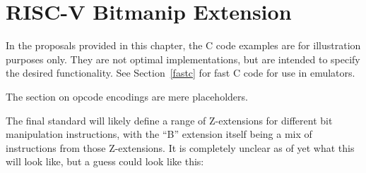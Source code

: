 \chapter{RISC-V Bitmanip Extension}
\label{bext}

In the proposals provided in this chapter, the C code examples are for
illustration purposes only. They are not optimal implementations, but are
intended to specify the desired functionality. See Section~\ref{fastc} for fast
C code for use in emulators.

The section on opcode encodings are mere placeholders.

The final standard will likely define a range of Z-extensions for different bit
manipulation instructions, with the ``B'' extension itself being a mix of
instructions from those Z-extensions. It is completely unclear as of yet what
this will look like, but a guess could look like this:

